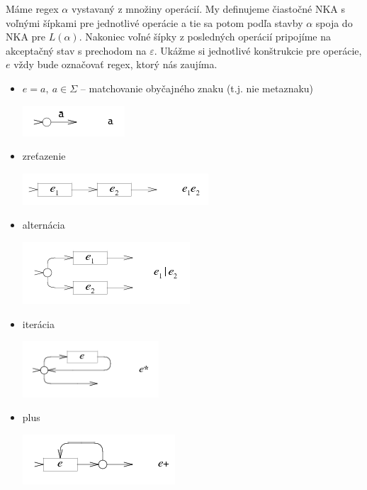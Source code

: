 Máme regex $\alpha$ vystavaný z množiny operácií. My definujeme čiastočné NKA s voľnými šípkami pre jednotlivé operácie a tie sa potom podľa stavby $\alpha$ spoja do NKA pre $L(\alpha )$. Nakoniec voľné šípky z posledných operácií pripojíme na akceptačný stav s prechodom na $\varepsilon$. Ukážme si jednotlivé konštrukcie pre operácie, $e$ vždy bude označovať regex, ktorý nás zaujíma.
\begin{itemize}
\item $e=a,~a\in \Sigma$ -- matchovanie obyčajného znaku (t.j. nie metaznaku)
\begin{center}
	 \includegraphics[scale=1]{obrazky/T_pismenko}
\end{center}
\item zreťazenie
\begin{center}
    \includegraphics[scale=1]{obrazky/T_zretazenie}
\end{center} 
\item alternácia
\begin{center}
    \includegraphics[scale = 1]{obrazky/T_alternacia}
\end{center}
\item iterácia
\begin{center}
    \includegraphics[width=0.40\textwidth]{obrazky/T_iteracia}
\end{center}
\item plus
\begin{center}
    \includegraphics[scale=1]{obrazky/T_plus}

\end{center}
\end{itemize}
